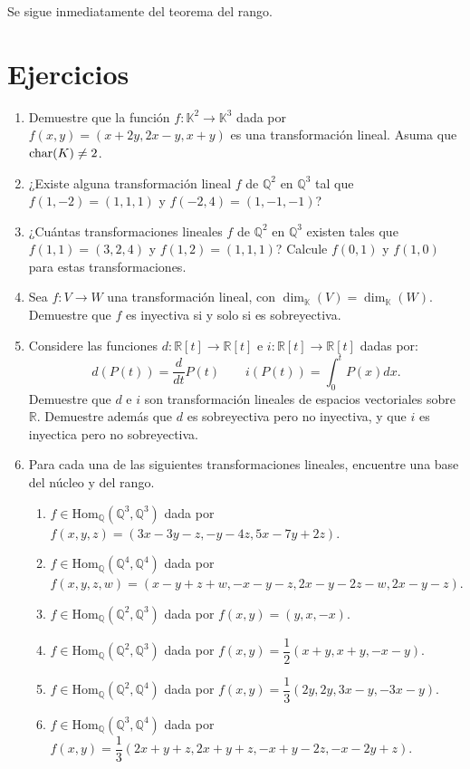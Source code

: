 \dem Se sigue inmediatamente del teorema del rango.

\section*{Ejercicios}

\begin{enumerate}
  \item Demuestre que la función $f:\mathbb{K}^2\rightarrow\mathbb{K}^3$ dada por $f(x,y)=(x+2y,2x-y,x+y)$ es una transformación lineal. Asuma que $\operatorname{char}(K)\ne 2$.
  \item ¿Existe alguna transformación lineal $f$ de $\mathbb{Q}^2$ en $\mathbb{Q}^3$ tal que $f(1,-2)=(1,1,1)$ y $f(-2,4)=(1,-1,-1)$?
  \item ¿Cuántas transformaciones lineales $f$ de $\mathbb{Q}^2$ en $\mathbb{Q}^3$ existen tales que $f(1,1)=(3,2,4)$ y $f(1,2)=(1,1,1)$? Calcule $f(0,1)$ y $f(1,0)$ para estas transformaciones.
  \item Sea $f:V\rightarrow W$ una transformación lineal, con $\dim_\mathbb{K}(V)=\dim_\mathbb{K}(W)$. Demuestre que $f$ es inyectiva si y solo si es sobreyectiva.
  \item Considere las funciones $d:\mathbb{R}[t]\rightarrow\mathbb{R}[t]$ e $i:\mathbb{R}[t]\rightarrow\mathbb{R}[t]$ dadas por:
  $$d(P(t))=\dfrac{d}{dt}P(t)\qquad i(P(t))=\int_0^tP(x)dx.$$
  Demuestre que $d$ e $i$ son transformación lineales de espacios vectoriales sobre $\mathbb{R}$. Demuestre además que $d$ es sobreyectiva pero no inyectiva, y que $i$ es inyectica pero no sobreyectiva.
  \item Para cada una de las siguientes transformaciones lineales, encuentre una base del núcleo y del rango.
    \begin{enumerate}
      \item $f\in\textrm{Hom}_{\mathbb{Q}}(\mathbb{Q}^3,\mathbb{Q}^3)$ dada por $f(x,y,z)=(3x-3y-z,-y-4z,5x-7y+2z)$.
      \item $f\in\textrm{Hom}_{\mathbb{Q}}(\mathbb{Q}^4,\mathbb{Q}^4)$ dada por $f(x,y,z,w)=(x-y+z+w,-x-y-z,2x-y-2z-w,2x-y-z)$.
      \item $f\in\textrm{Hom}_{\mathbb{Q}}(\mathbb{Q}^2,\mathbb{Q}^3)$ dada por $f(x,y)=(y,x,-x)$.
      \item $f\in\textrm{Hom}_{\mathbb{Q}}(\mathbb{Q}^2,\mathbb{Q}^3)$ dada por $f(x,y)=\dfrac{1}{2}(x+y,x+y,-x-y)$.
      \item $f\in\textrm{Hom}_{\mathbb{Q}}(\mathbb{Q}^2,\mathbb{Q}^4)$ dada por $f(x,y)=\dfrac{1}{3}(2y,2y,3x-y,-3x-y)$.
      \item $f\in\textrm{Hom}_{\mathbb{Q}}(\mathbb{Q}^3,\mathbb{Q}^4)$ dada por $f(x,y)=\dfrac{1}{3}(2x+y+z,2x+y+z,-x+y-2z,-x-2y+z)$.
    \end{enumerate}
\end{enumerate}


